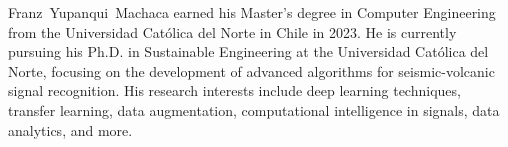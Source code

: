 \documentclass[journal]{IEEEtran}
\begin{document}


%
%
%
\printbibliography



%
\begin{IEEEbiography}{Franz~Yupanqui~Machaca}
earned his Master's degree in Computer Engineering from the Universidad Católica del Norte in Chile in 2023. He is currently pursuing his Ph.D. in Sustainable Engineering at the Universidad Católica del Norte, focusing on the development of advanced algorithms for seismic-volcanic signal recognition. His research interests include deep learning techniques, transfer learning, data augmentation, computational intelligence in signals, data analytics, and more.
\end{IEEEbiography}
\end{document}
